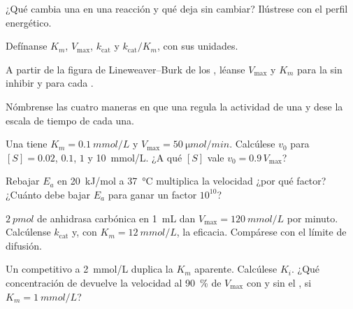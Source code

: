 \begin{exercise}[$\star$]\label{exo:b1:enzymes:1}
¿Qué cambia una  en una reacción y qué deja sin cambiar? Ilústrese con
el perfil energético.
\end{exercise}

\begin{exercise}[$\star$]\label{exo:b1:enzymes:2}
Defínanse $K_m$, $V_{\max}$, $k_{\text{cat}}$ y $k_{\text{cat}}/K_m$, con
sus unidades.
\end{exercise}

\begin{exercise}[$\star$]\label{exo:b1:enzymes:3}
A partir de la figura de Lineweaver--Burk de los , léanse
$V_{\max}$ y $K_m$ para la  sin inhibir y para cada .
\end{exercise}

\begin{exercise}[$\star$]\label{exo:b1:enzymes:4}
Nómbrense las cuatro maneras en que una  regula la actividad de una
 y dese la escala de tiempo de cada una.
\end{exercise}

\begin{exercise}[$\star\star$]\label{exo:b1:enzymes:5}
Una  tiene $K_m = \qty{0.1}{mmol/L}$ y
$V_{\max} =
\qty{50}{\micro mol/min}$. Calcúlese $v_0$ para $[S] = 0.02$,
$0.1$, $1$ y \qty{10}{mmol/L}. ¿A qué $[S]$ vale $v_0 = 0.9\,V_{\max}$?
\end{exercise}

\begin{exercise}[$\star\star$]\label{exo:b1:enzymes:6}
Rebajar $E_a$ en \qty{20}{kJ/mol} a \qty{37}{\celsius} multiplica la
velocidad ¿por qué factor? ¿Cuánto debe bajar $E_a$ para ganar un factor
$10^{10}$?
\end{exercise}

\begin{exercise}[$\star\star$]\label{exo:b1:enzymes:7}
$\qty{2}{pmol}$ de anhidrasa carbónica en \qty{1}{mL} dan
$V_{\max} = \qty{120}{mmol/L}$ por minuto. Calcúlense $k_{\text{cat}}$ y,
con $K_m = \qty{12}{mmol/L}$, la eficacia. Compárese con el límite de
difusión.
\end{exercise}

\begin{exercise}[$\star\star$]\label{exo:b1:enzymes:8}
Un  competitivo a \qty{2}{mmol/L} duplica la $K_m$ aparente.
Calcúlese $K_i$. ¿Qué concentración de  devuelve la velocidad al
\qty{90}{\%} de $V_{\max}$ con y sin el , si
$K_m = \qty{1}{mmol/L}$?
\end{exercise}

